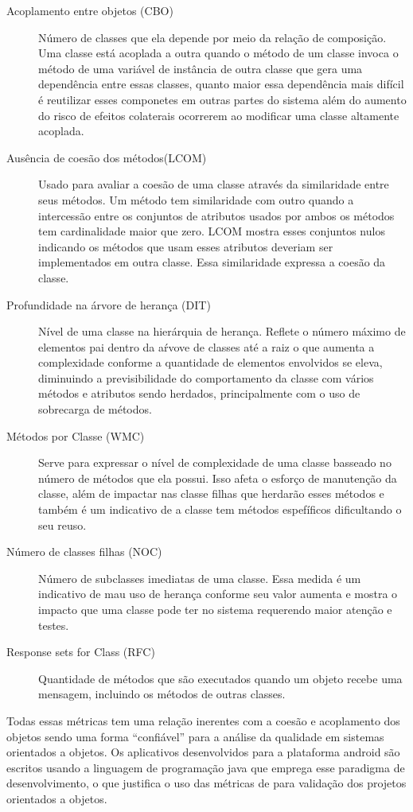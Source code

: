 \begin{description}
\item[Acoplamento entre objetos (CBO)] Número de classes que ela depende por
meio da relação de composição. Uma classe está acoplada a outra quando o método
de um classe invoca o método de uma variável de instância de outra classe que
gera uma dependência entre essas classes, quanto maior essa dependência mais
difícil é reutilizar esses componetes em outras partes do sistema além do
aumento do risco de efeitos colaterais ocorrerem ao modificar uma classe
altamente acoplada.
\item[Ausência de coesão dos métodos(LCOM)] Usado para avaliar a coesão de uma
classe através da similaridade entre seus métodos. Um método tem similaridade
com outro quando a intercessão entre os conjuntos de atributos usados por ambos
os métodos tem cardinalidade maior que zero. LCOM mostra esses conjuntos nulos
indicando os métodos que usam esses atributos deveriam ser implementados em
outra classe. Essa similaridade expressa a coesão da classe.
\item[Profundidade na árvore de herança (DIT)] Nível de uma classe na
hierárquia de herança. Reflete o número máximo de elementos pai dentro da aŕvove
de classes até a raiz o que aumenta a complexidade conforme a quantidade de
elementos envolvidos se eleva, diminuindo a previsibilidade do comportamento da
classe com vários métodos e atributos sendo herdados, principalmente com o uso
de sobrecarga de métodos.
\item[Métodos por Classe (WMC)] Serve para expressar o nível de complexidade de
uma classe basseado no número de métodos que ela possui. Isso afeta o esforço de
manutenção da classe, além de impactar nas classe filhas que herdarão esses
métodos e também é um indicativo de a classe tem métodos espefíficos
dificultando o seu reuso.
\item[Número de classes filhas (NOC)] Número de subclasses imediatas de uma
classe. Essa medida é um indicativo de mau uso de herança conforme seu valor
aumenta e mostra o impacto que uma classe pode ter no sistema requerendo maior
atenção e testes.
\item[Response sets for Class (RFC)] Quantidade de métodos que são executados
quando um objeto recebe uma mensagem, incluindo os métodos de outras classes. 
\end{description}

Todas essas métricas tem uma relação inerentes com a coesão e acoplamento dos
objetos sendo uma forma ``confiável'' para a análise da qualidade em sistemas
orientados a objetos. Os aplicativos desenvolvidos para a plataforma android são
escritos usando a linguagem de programação java que emprega esse paradigma de
desenvolvimento, o que justifica o uso das métricas de  para
validação dos projetos orientados a objetos.

